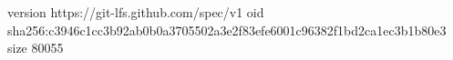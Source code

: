 version https://git-lfs.github.com/spec/v1
oid sha256:c3946c1cc3b92ab0b0a3705502a3e2f83efe6001c96382f1bd2ca1ec3b1b80e3
size 80055
